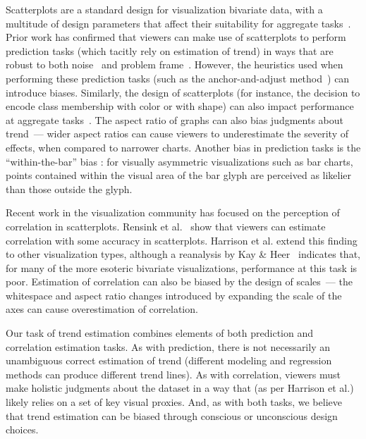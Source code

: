 \documentclass{sigchi}
\begin{document}
Scatterplots are a standard design for visualization bivariate data, with a multitude of design parameters that affect their suitability for aggregate tasks~\cite{cleveland1984many}. Prior work has confirmed that viewers can make use of scatterplots to perform prediction tasks (which tacitly rely on estimation of trend) in ways that are robust to both noise~\cite{harvey1997effects} and problem frame~\cite{lewandowsky2011popular}. However, the heuristics used when performing these prediction tasks (such as the anchor-and-adjust method~\cite{bolger1993context}) can introduce biases. Similarly, the design of scatterplots (for instance, the decision to encode class membership with color or with shape) can also impact performance at aggregate tasks~\cite{gleicher2013perception,lewandowsky1989discriminating}. The aspect ratio of graphs can also bias judgments about trend~\cite{beattie2002impact}--- wider aspect ratios can cause viewers to underestimate the severity of effects, when compared to narrower charts. Another bias in prediction tasks is the ``within-the-bar'' bias \cite{newman2012bar}: for visually asymmetric visualizations such as bar charts, points contained within the visual area of the bar glyph are perceived as likelier than those outside the glyph.

Recent work in the visualization community has focused on the perception of correlation in scatterplots. Rensink et al.~\cite{rensink2010perception} show that viewers can estimate correlation with some accuracy in scatterplots. Harrison et al. \cite{harrison2014ranking} extend this finding to other visualization types, although a reanalysis by Kay \& Heer~\cite{kay2016beyond} indicates that, for many of the more esoteric bivariate visualizations, performance at this task is poor. Estimation of correlation can also be biased by the design of scales~\cite{cleveland1982variables}--- the whitespace and aspect ratio changes introduced by expanding the scale of the axes can cause overestimation of correlation.

Our task of trend estimation combines elements of both prediction and correlation estimation tasks. As with prediction, there is not necessarily an unambiguous correct estimation of trend (different modeling and regression methods can produce different trend lines). As with correlation, viewers must make holistic judgments about the dataset in a way that (as per Harrison et al.) likely relies on a set of key visual proxies. And, as with both tasks, we believe that trend estimation can be biased through conscious or unconscious design choices.
\end{document}
